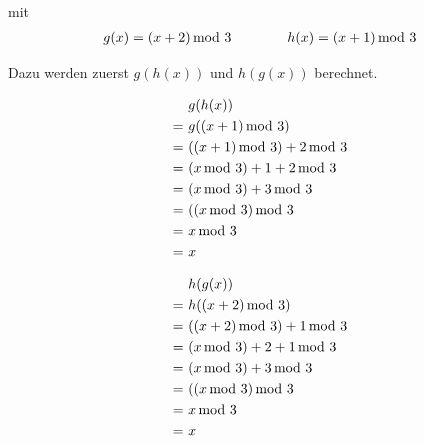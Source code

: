 \documentclass[12pt,a4paper, usenames, dvipsnames]{article}
\theoremstyle{mystyle}
\theoremstyle{definition}
\begin{document}
mit
\begin{align*}
g(x)=(x + 2) \hspace*{-0.5em} \mod 3 \ \ \ \ \ \ \ \ \ \ \ \ h(x) = (x+1) \hspace*{-0.5em} \mod 3 
\end{align*}

Dazu werden zuerst $g(h(x))$ und $h(g(x))$ berechnet.

\begin{minipage}[H]{0.5\textwidth}
      \begin{align*}
		 & g(h(x)) \\
		= \ & g((x+1) \hspace*{-0.5em} \mod 3) \\
		= \ & ((x+1) \hspace*{-0.5em} \mod 3) +2 \hspace*{-0.5em} \mod 3  \\
		= \ & (x \hspace*{-0.5em} \mod 3) +1 +2 \hspace*{-0.5em} \mod 3  \\
		= \ & (x \hspace*{-0.5em} \mod 3) +3 \hspace*{-0.5em} \mod 3  \\
		= \ & ((x \hspace*{-0.5em} \mod 3) \hspace*{-0.5em} \mod 3  \\
		= \ & x \hspace*{-0.5em} \mod 3 \\
		= \ & x \\
	\end{align*}
\end{minipage}
\begin{minipage}[H]{0.5\textwidth}
      \begin{align*}
		 & h(g(x)) \\
		= \ & h((x+2) \hspace*{-0.5em} \mod 3) \\
		= \ & ((x+2) \hspace*{-0.5em} \mod 3) +1 \hspace*{-0.5em} \mod 3  \\
		= \ & (x \hspace*{-0.5em} \mod 3) +2 +1 \hspace*{-0.5em} \mod 3  \\
		= \ & (x \hspace*{-0.5em} \mod 3) +3 \hspace*{-0.5em} \mod 3  \\
		= \ & ((x \hspace*{-0.5em} \mod 3) \hspace*{-0.5em} \mod 3  \\
		= \ & x \hspace*{-0.5em} \mod 3 \\
		= \ & x \\
	\end{align*}
\end{minipage}
\end{document}

